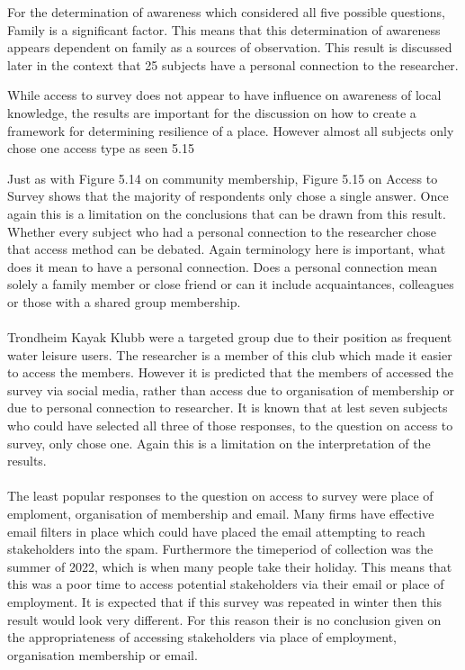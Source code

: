 For the determination of awareness which considered all five possible questions, Family is a significant factor. This means that this determination of awareness appears dependent on family as a sources of observation. This result is discussed later in the context that 25 subjects have a personal connection to the researcher.

While access to survey does not appear to have influence on awareness of local knowledge, the results are important for the discussion on how to create a framework for determining resilience of a place. However almost all subjects only chose one access type as seen 5.15

Just as with Figure 5.14 on community membership, Figure 5.15 on Access to Survey shows that the majority of respondents only chose a single answer. Once again this is a limitation on the conclusions that can be drawn from this result. Whether every subject who had a personal connection to the researcher chose that access method can be debated. Again terminology here is important, what does it mean to have a personal connection. Does a personal connection mean solely a family member or close friend or can it include acquaintances, colleagues or those with a shared group membership. 
\paragraph{}
Trondheim Kayak Klubb were a targeted group due to their position as frequent water leisure users. The researcher is a member of this club which made it easier to access the members. However it is predicted that the members of accessed the survey via social media, rather than access due to organisation of membership or due to personal connection to researcher. It is known that at lest seven subjects who could have selected all three of those responses, to the question on access to survey, only chose one. Again this is a limitation on the interpretation of the results. 
\paragraph{}
The least popular responses to the question on access to survey were place of emploment, organisation of membership and email. Many firms have effective email filters in place which could have placed the email attempting to reach stakeholders into the spam. Furthermore the timeperiod of collection was the summer of 2022, which is when many people take their holiday. This means that this was a poor time to access potential stakeholders via their email or place of employment. It is expected that if this survey was repeated in winter then this result would look very different. For this reason their is no conclusion given on the appropriateness of accessing stakeholders via place of employment, organisation membership or email.
